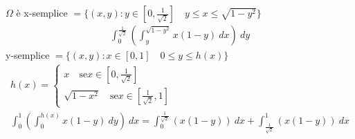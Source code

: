 \documentclass[a4paper, oneside]{article}
\begin{document}
$\Omega$ è x-semplice $= \{ (x,y): y \in [0,\frac{1}{\sqrt{2}}] \quad y \leq x \leq \sqrt{1-y^2} \}$
\begin{gather*}
    \int_{0}^{\frac{1}{\sqrt{2}}} \left( \int_{y}^{\sqrt{1-y^2}} x(1-y) \ dx \right) \ dy
\end{gather*}
y-semplice $= \{(x,y): x \in [0,1] \quad  0 \leq y \leq h(x) \}$
\begin{gather*}
    h(x)=
    \begin{cases}
        x \quad \text{se} x \in [0,\frac{1}{\sqrt{2}}]\\
        \sqrt{1-x^2} \quad \text{se} x \in [\frac{1}{\sqrt{2}},1]
    \end{cases}\\
    \int_{0}^{1} \left( \int_{0}^{h(x)} x(1-y) \ dy \right) \ dx = \int_{0}^{\frac{1}{\sqrt{2}}} \left( x \left( 1-y \right) \right) \ dx + \int_{\frac{1}{\sqrt{2}}}^{1} \left( x \left( 1-y \right)  \right) \ dx\\
\end{gather*}

\newpage
\end{document}
